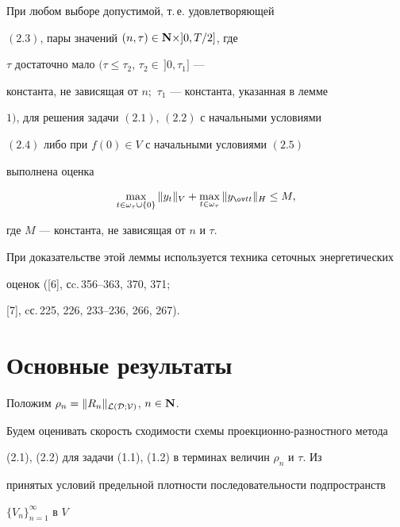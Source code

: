 \begin{lem}


При любом выборе допустимой, т.\,е. удовлетворяющей


$(2.3)$, пары значений $(n,\tau)\in{\bold N}\times]0,T/2]$, где


$\tau$ достаточно мало $(\tau\le\tau_2$, $\tau_2\in\,]0,\tau_1]$ ---


константа, не зависящая от $n;$ $\tau_1$ --- константа, указанная в лемме


$1)$, для решения задачи $(2.1)$, $(2.2)$ с начальными условиями


$(2.4)$ либо при $f(0)\in V$ с начальными условиями $(2.5)$


выполнена оценка


\begin{equation}


\max\limits_{t\in\omega_\tau\cup\{0\}}\|y_t\|_V+


\max\limits_{t\in\omega_\tau}\|y_{\ov tt}\|_H\le M,


\end{equation}


где $M$ --- константа, не зависящая от $n$ и $\tau$.


\end{lem}





При доказательстве этой леммы используется техника сеточных энергетических


оценок ([6], сc.\,356--363, 370, 371;


[7], cс.\,225, 226, 233--236, 266, 267).





\section{Основные результаты}





Положим $\rho_n=\|R_n\|_{\cal L(D;V)}$, $n\in{\bold N}$.


Будем оценивать скорость сходимости схемы проекционно-разностного метода


(2.1), (2.2) для задачи (1.1), (1.2) в терминах величин $\rho_n$ и $\tau$. Из


принятых условий предельной плотности последовательности подпространств


$\{V_n\}_{n=1}^{\infty}$ в $V$


